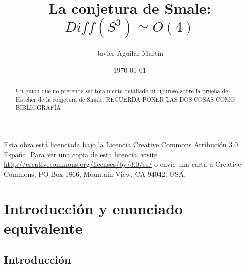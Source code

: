 \documentclass[twoside, 11pt]{article}
\begin{document}

\author{Javier Aguilar Martín }
\date{\today}
\title{La conjetura de Smale:\\ $Diff(S^3)\simeq O(4)$}

\maketitle


\begin{abstract}
Un guion que no pretende ser totalmente detallado ni riguroso sobre la prueba de Hatcher de la conjetura de Smale. RECUERDA PONER LAS DOS COSAS COMO BIBLIOGRAFÍA
\end{abstract}


	\vfill
	Esta obra está licenciada bajo la Licencia Creative Commons Atribución 3.0 España. Para ver una copia de esta licencia, visite \url{http://creativecommons.org/licenses/by/3.0/es/} o envíe una carta a Creative Commons, PO Box 1866, Mountain View, CA 94042, USA.


\newpage
\tableofcontents

\newpage

\section{Introducción y enunciado equivalente}
\subsection{Introducción}
\end{document}

